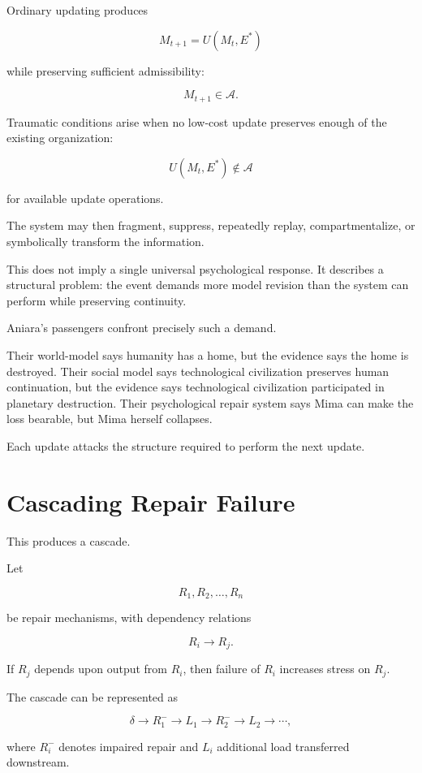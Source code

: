 \documentclass[11pt,oneside]{book}
\theoremstyle{definition}
\theoremstyle{remark}
\newcommand{\A}{\mathcal{A}}
\begin{document}
Ordinary updating produces

\[
M_{t+1}=U(M_t,E^\ast)
\]

while preserving sufficient admissibility:

\[
M_{t+1}\in\A.
\]

Traumatic conditions arise when no low-cost update preserves enough of the existing organization:

\[
U(M_t,E^\ast)\notin\A
\]

for available update operations.

The system may then fragment, suppress, repeatedly replay, compartmentalize, or symbolically transform the information.

This does not imply a single universal psychological response. It describes a structural problem: the event demands more model revision than the system can perform while preserving continuity.

Aniara's passengers confront precisely such a demand.

Their world-model says humanity has a home, but the evidence says the home is destroyed. Their social model says technological civilization preserves human continuation, but the evidence says technological civilization participated in planetary destruction. Their psychological repair system says Mima can make the loss bearable, but Mima herself collapses.

Each update attacks the structure required to perform the next update.

\section{Cascading Repair Failure}

This produces a cascade.

Let

\[
R_1,R_2,\ldots,R_n
\]

be repair mechanisms, with dependency relations

\[
R_i\rightarrow R_j.
\]

If \(R_j\) depends upon output from \(R_i\), then failure of \(R_i\) increases stress on \(R_j\).

The cascade can be represented as

\[
\delta
\rightarrow
R_1^{-}
\rightarrow
L_1
\rightarrow
R_2^{-}
\rightarrow
L_2
\rightarrow\cdots,
\]

where \(R_i^{-}\) denotes impaired repair and \(L_i\) additional load transferred downstream.
\end{document}
